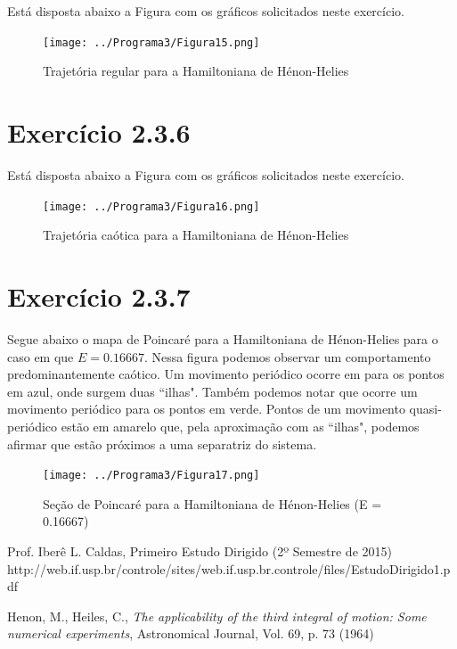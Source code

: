 \documentclass[a4paper,10pt]{article}
\begin{document}
  Está disposta abaixo a Figura com os gráficos solicitados neste exercício.

\begin{figure}[H]
  \centering
  \texttt{[image: ../Programa3/Figura15.png]}
  \caption{Trajetória regular para a Hamiltoniana de Hénon-Helies}
\end{figure}

\section*{Exercício 2.3.6}

  Está disposta abaixo a Figura com os gráficos solicitados neste exercício.

\begin{figure}[H]
  \centering
  \texttt{[image: ../Programa3/Figura16.png]}
  \caption{Trajetória caótica para a Hamiltoniana de Hénon-Helies}
\end{figure}


\section*{Exercício 2.3.7}

  Segue abaixo o mapa de Poincaré para a Hamiltoniana de Hénon-Helies para o caso em que $E = 0.16667$. Nessa figura podemos observar um comportamento
  predominantemente caótico. Um movimento periódico ocorre em para os pontos em azul, onde surgem duas ``ilhas". Também podemos notar que ocorre um
  movimento periódico para os pontos em verde. Pontos de um movimento quasi-periódico estão em amarelo que, pela aproximação com as ``ilhas", podemos
  afirmar que estão próximos a uma separatriz do sistema.

\begin{figure}[H]
  \centering
  \texttt{[image: ../Programa3/Figura17.png]}
  \caption{Seção de Poincaré para a Hamiltoniana de Hénon-Helies (E = 0.16667)}
\end{figure}

\begin{thebibliography}{99}

Prof. Iberê L. Caldas, Primeiro Estudo Dirigido (2º Semestre de 2015) \\ http://web.if.usp.br/controle/sites/web.if.usp.br.controle/files/EstudoDirigido1.pdf

Henon, M., Heiles, C., \emph{The applicability of the third integral of motion: Some numerical experiments}, Astronomical Journal, Vol. 69, p. 73 (1964)

\end{thebibliography}
\end{document}
